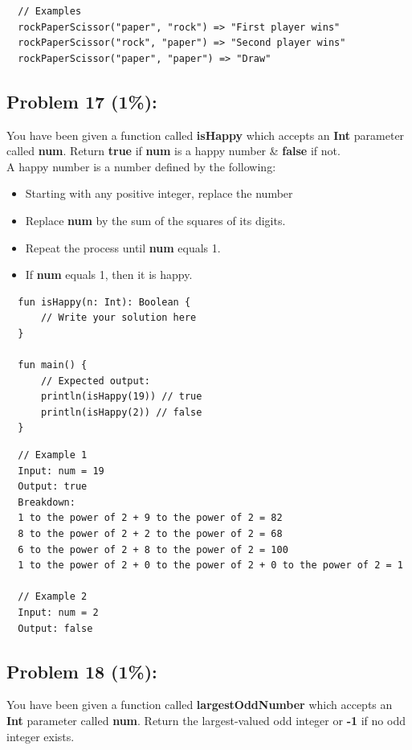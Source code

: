 \documentclass{article}
\begin{document}
\begin{verbatim}
  // Examples
  rockPaperScissor("paper", "rock") => "First player wins"
  rockPaperScissor("rock", "paper") => "Second player wins"
  rockPaperScissor("paper", "paper") => "Draw"
\end{verbatim}

\subsection*{Problem 17 (1\%):}
You have been given a function called \textbf{isHappy} which accepts an \textbf{Int} parameter called \textbf{num}. Return \textbf{true} if \textbf{num} is a happy number \& \textbf{false} if not.\\

A happy number is a number defined by the following:
\begin{itemize}
  \item Starting with any positive integer, replace the number 
  \item Replace \textbf{num} by the sum of the squares of its digits.
  \item Repeat the process until \textbf{num} equals 1.
  \item If \textbf{num} equals 1, then it is happy.
\end{itemize}

\begin{verbatim}
  fun isHappy(n: Int): Boolean {
      // Write your solution here
  }

  fun main() {
      // Expected output:
      println(isHappy(19)) // true
      println(isHappy(2)) // false
  }
\end{verbatim}

\begin{verbatim}
  // Example 1
  Input: num = 19
  Output: true
  Breakdown:
  1 to the power of 2 + 9 to the power of 2 = 82
  8 to the power of 2 + 2 to the power of 2 = 68
  6 to the power of 2 + 8 to the power of 2 = 100
  1 to the power of 2 + 0 to the power of 2 + 0 to the power of 2 = 1
  
  // Example 2
  Input: num = 2
  Output: false
\end{verbatim}

\subsection*{Problem 18 (1\%):}
You have been given a function called \textbf{largestOddNumber} which accepts an \textbf{Int} parameter called \textbf{num}. Return the largest-valued odd integer or \textbf{-1} if no odd integer exists.
\end{document}
